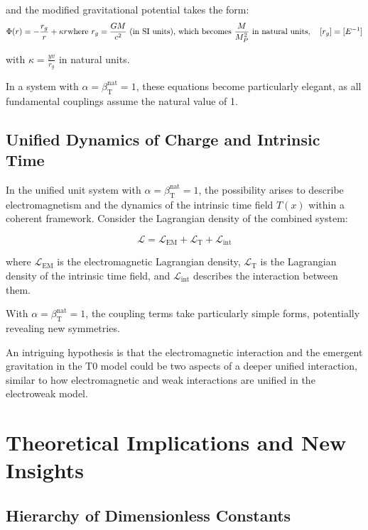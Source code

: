 \documentclass[12pt,a4paper]{article}
\newcommand{\Tfield}{T(x)}
\newcommand{\betaT}{\beta_{\text{T}}}
\begin{document}
	and the modified gravitational potential takes the form:
	\begin{equation}
		\Phi(r) = -\frac{r_g}{r} + \kappa r\\\text{where } r_g = \frac{GM}{c^2} \text{ (in SI units), which becomes } \frac{M}{M_P^2} \text{ in natural units}, \quad [r_g] = [E^{-1}]

	\end{equation}
	
	with \(\kappa = \frac{y v}{r_g}\) in natural units.
	
	In a system with \(\alpha = \betaT^{\text{nat}} = 1\), these equations become particularly elegant, as all fundamental couplings assume the natural value of 1.
	
	\subsection{Unified Dynamics of Charge and Intrinsic Time}
	
	In the unified unit system with \(\alpha = \betaT^{\text{nat}} = 1\), the possibility arises to describe electromagnetism and the dynamics of the intrinsic time field \(\Tfield\) within a coherent framework. Consider the Lagrangian density of the combined system:
	
	\begin{equation}
		\mathcal{L} = \mathcal{L}_{\text{EM}} + \mathcal{L}_{\text{T}} + \mathcal{L}_{\text{int}}
	\end{equation}
	
	where \(\mathcal{L}_{\text{EM}}\) is the electromagnetic Lagrangian density, \(\mathcal{L}_{\text{T}}\) is the Lagrangian density of the intrinsic time field, and \(\mathcal{L}_{\text{int}}\) describes the interaction between them.
	
	With \(\alpha = \betaT^{\text{nat}} = 1\), the coupling terms take particularly simple forms, potentially revealing new symmetries.
	
	An intriguing hypothesis is that the electromagnetic interaction and the emergent gravitation in the T0 model could be two aspects of a deeper unified interaction, similar to how electromagnetic and weak interactions are unified in the electroweak model.
	
	\section{Theoretical Implications and New Insights}
	
	\subsection{Hierarchy of Dimensionless Constants}
	
\end{document}
